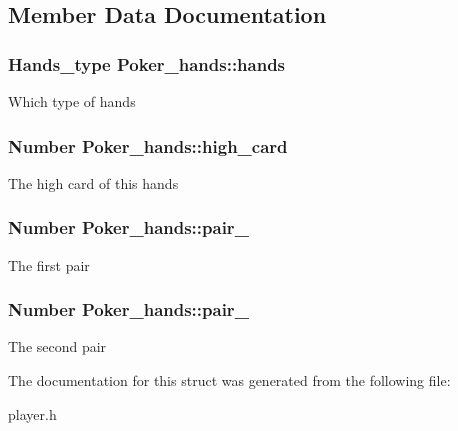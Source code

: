 \subsection{Member Data Documentation}
\hypertarget{structPoker__hands_a7b36a51226eea12e0860c901a770820f}{
\subsubsection[{hands}]{\setlength{\rightskip}{0pt plus 5cm}Hands\+\_\+type Poker\+\_\+hands\+::hands}}\label{structPoker__hands_a7b36a51226eea12e0860c901a770820f}
Which type of hands \hypertarget{structPoker__hands_a5e69528aafb7fd7a71ad83d7a7f03456}{
\subsubsection[{high\+\_\+card}]{\setlength{\rightskip}{0pt plus 5cm}Number Poker\+\_\+hands\+::high\+\_\+card}}\label{structPoker__hands_a5e69528aafb7fd7a71ad83d7a7f03456}
The high card of this hands \hypertarget{structPoker__hands_ad0638d6685ba9b386f479f14c47c0790}{
\subsubsection[{pair\+\_\+1}]{\setlength{\rightskip}{0pt plus 5cm}Number Poker\+\_\+hands\+::pair\+\_}}\label{structPoker__hands_ad0638d6685ba9b386f479f14c47c0790}
The first pair \hypertarget{structPoker__hands_aaa7790b1295984b266b3609a2f582bb8}{
\subsubsection[{pair\+\_\+2}]{\setlength{\rightskip}{0pt plus 5cm}Number Poker\+\_\+hands\+::pair\+\_}}\label{structPoker__hands_aaa7790b1295984b266b3609a2f582bb8}
The second pair 

The documentation for this struct was generated from the following file\+:\begin{DoxyCompactItemize}
\item 
player.\+h\end{DoxyCompactItemize}
